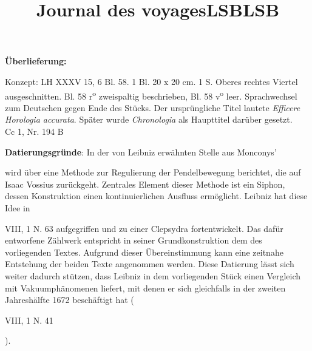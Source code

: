       
               
                \begin{ledgroupsized}[r]{120mm}
                \footnotesize 
                \pstart                
                \noindent\textbf{\"{U}berlieferung:}   
                \pend
                \end{ledgroupsized}
            
              
                            \begin{ledgroupsized}[r]{114mm}
                            \footnotesize 
                            \pstart \parindent -6mm
                            Konzept: LH XXXV 15,  6 Bl. 58. 1 Bl. 20 x 20 cm. 1 S. Oberes rechtes Viertel ausgeschnitten. Bl. 58 r\textsuperscript{o} zweispaltig beschrieben, Bl. 58 v\textsuperscript{o} leer. Sprachwechsel zum Deutschen gegen Ende des St\"{u}cks. Der urspr\"{u}ngliche Titel lautete \textit{Efficere Horologia accurata}. Sp\"{a}ter wurde \textit{Chronologia} als Haupttitel dar\"{u}ber gesetzt. \\Cc 1, Nr. 194 B \pend
                            \end{ledgroupsized}
                \vspace*{5mm}
                \begin{ledgroup}
                \footnotesize 
                \pstart
            \noindent\footnotesize{\textbf{Datierungsgr\"{u}nde}: In der von Leibniz erw\"{a}hnten Stelle aus Monconys' \title[134]{Journal des voyages} wird \"{u}ber eine Methode zur Regulierung der Pendelbewegung berichtet, die auf Isaac Vossius zur\"{u}ckgeht. Zentrales Element dieser Methode ist ein Siphon, dessen Konstruktion einen kontinuierlichen Ausfluss erm\"{o}glicht. Leibniz hat diese Idee in \title[115]{LSB} VIII, 1 N. 63 aufgegriffen und zu einer Clepsydra fortentwickelt. Das daf\"{u}r entworfene Z\"{a}hlwerk entspricht in seiner Grundkonstruktion dem des vorliegenden Textes. Aufgrund dieser \"{U}bereinstimmung kann eine zeitnahe Entstehung der beiden Texte angenommen werden. Diese Datierung lässt sich weiter dadurch st\"{u}tzen, dass Leibniz in dem vorliegenden St\"{u}ck einen Vergleich mit Vakuumph\"{a}nomenen liefert, mit denen er sich gleichfalls in der zweiten Jahresh\"{a}lfte 1672 beschäftigt hat (\title[115]{LSB} VIII, 1 N. 41}).
                \pend
                \end{ledgroup}
            

